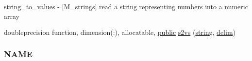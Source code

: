 \begin{DoxyCompactItemize}
\begin{DoxyCompactList}
string\+\_\+to\+\_\+values -\/ \mbox{[}M\+\_\+strings\mbox{]} read a string representing numbers into a numeric array \end{DoxyCompactList}\item 
doubleprecision function, dimension(\+:), allocatable, \hyperlink{M__stopwatch_83_8txt_a2f74811300c361e53b430611a7d1769f}{public} \hyperlink{namespacem__strings_ad7fffe79559a666aa28e1ed598b8670f}{s2vs} (\hyperlink{what__overview_81_8txt_a74cb7e955273b9f9157b4f0c18a38849}{string}, \hyperlink{namespacem__strings_a9890da826d63d6f04367887007611cb5}{delim})
\begin{DoxyCompactList}\small\item\em \subsubsection*{N\+A\+ME}


\end{DoxyCompactList}
\end{DoxyCompactItemize}
